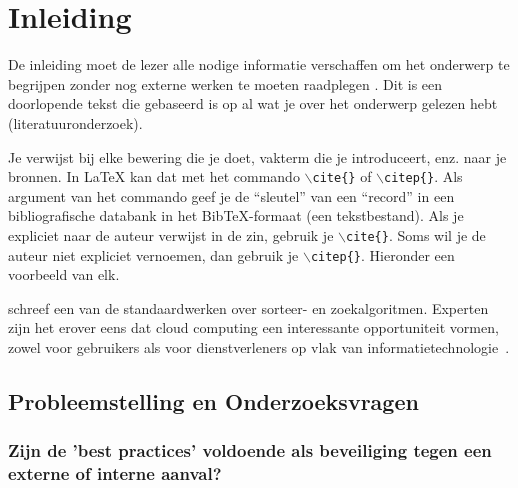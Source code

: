 \documentclass[pdftex,a4paper,12pt]{report}
\begin{document}
\tableofcontents



\chapter{Inleiding}
\label{ch:inleiding}

De inleiding moet de lezer alle nodige informatie verschaffen om het onderwerp te begrijpen zonder nog externe werken te moeten raadplegen \citep{Pollefliet2011}. Dit is een doorlopende tekst die gebaseerd is op al wat je over het onderwerp gelezen hebt (literatuuronderzoek). \newline \newline

Je verwijst bij elke bewering die je doet, vakterm die je introduceert, enz. naar je bronnen. In \LaTeX{} kan dat met het commando \texttt{$\backslash${cite\{\}}} of \texttt{$\backslash${citep\{\}}}. Als argument van het commando geef je de ``sleutel'' van een ``record'' in een bibliografische databank in het Bib\TeX{}-formaat (een tekstbestand). Als je expliciet naar de auteur verwijst in de zin, gebruik je \texttt{$\backslash${}cite\{\}}.
Soms wil je de auteur niet expliciet vernoemen, dan gebruik je \texttt{$\backslash${}citep\{\}}. Hieronder een voorbeeld van elk.

\cite{Knuth1998} schreef een van de standaardwerken over sorteer- en zoekalgoritmen. Experten zijn het erover eens dat cloud computing een interessante opportuniteit vormen, zowel voor gebruikers als voor dienstverleners op vlak van informatietechnologie~\citep{Creeger2009}.

\section{Probleemstelling en Onderzoeksvragen}
\label{sec:onderzoeksvragen}

\subsection{Zijn de 'best practices' voldoende als beveiliging tegen een externe of interne aanval?}
\end{document}
